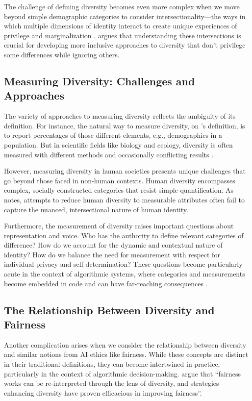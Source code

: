 The challenge of defining diversity becomes even more complex when we move beyond simple demographic categories to consider intersectionality—the ways in which multiple dimensions of identity interact to create unique experiences of privilege and marginalization \cite{crenshaw1989demarginalizing}. \textcite{collins2002black} argues that understanding these intersections is crucial for developing more inclusive approaches to diversity that don't privilege some differences while ignoring others.

\subsection{Measuring Diversity: Challenges and Approaches}\label{ssec:measuring_diversity}
The variety of approaches to measuring diversity reflects the ambiguity of its definition. For instance, the natural way to measure diversity, on \textcite{page_diversity_2010}'s definition, is to report percentages of those different elements, e.g., demographics in a population. But in scientific fields like biology and ecology, diversity is often measured with different methods and occasionally conflicting results \cite{xu2020diversity}.

However, measuring diversity in human societies presents unique challenges that go beyond those faced in non-human contexts. Human diversity encompasses complex, socially constructed categories that resist simple quantification. As \textcite{scheuerman2019computers} notes, attempts to reduce human diversity to measurable attributes often fail to capture the nuanced, intersectional nature of human identity.

Furthermore, the measurement of diversity raises important questions about representation and voice. Who has the authority to define relevant categories of difference? How do we account for the dynamic and contextual nature of identity? How do we balance the need for measurement with respect for individual privacy and self-determination? These questions become particularly acute in the context of algorithmic systems, where categories and measurements become embedded in code and can have far-reaching consequences \cite{bowker1999sorting}.

\subsection{The Relationship Between Diversity and Fairness}\label{ssec:diversity_fairness}
Another complication arises when we consider the relationship between diversity and similar notions from AI ethics like fairness. While these concepts are distinct in their traditional definitions, they can become intertwined in practice, particularly in the context of algorithmic decision-making. \textcite{zhao2023fairness} argue that ``fairness works can be re-interpreted through the lens of diversity, and strategies enhancing diversity have proven efficacious in improving fairness''.

